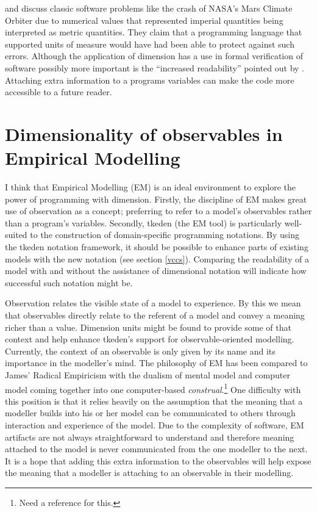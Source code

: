 \documentclass[a4paper]{article}
\begin{document}
\cite{ME_grosu} and \cite{ME_hall} discuss classic software problems like the 
crash of NASA's Mars Climate Orbiter
 due to numerical values that represented imperial quantities being 
interpreted as metric quantities. They claim that a programming language that
supported units of measure would have had been able to protect against
such errors.
Although the application of dimension has a use in formal verification of 
software \cite{ME_grosu,ME_hayes} 
possibly more important is the 
``increased readability'' pointed out by \cite{ME_karrLoveman}. Attaching extra
information to a programs variables can make the code more accessible to a 
future reader.

\section{Dimensionality of observables in Empirical Modelling} 

I think that Empirical Modelling (EM) is an ideal environment
 to explore the power of programming with dimension. Firstly, the discipline 
of EM makes great use of observation as a concept;
preferring to refer to a model's observables rather than a program's variables.
Secondly, tkeden (the EM tool) is particularly well-suited to the construction
of domain-specific programming notations. By using the tkeden notation 
framework, it should be possible to enhance parts of existing models with the 
new notation (see section \ref{vccs}). Comparing the readability of a model 
with and without the assistance of dimensional notation will indicate how 
successful such notation might be.

Observation relates the visible state of a model to experience. By this we
mean that observables directly relate to the referent of a model and convey a 
meaning richer than a value.
Dimension units 
might be found to provide some of that context and help enhance tkeden's 
support for observable-oriented modelling. Currently, the context of an 
observable is only given by its name and its
importance in the modeller's mind. The philosophy of EM has been compared to 
James' Radical Empiricism with the dualism
of mental model and computer model coming together into one computer-based 
\emph{construal}.\footnote{
Need a reference for this.} One difficulty with this
position is that it relies heavily on the assumption that the meaning that a 
modeller builds into his or her model can
be communicated to others through interaction and experience of the model. Due 
to the complexity of software, EM artifacts are not always straightforward to 
understand and therefore meaning attached to the model is never communicated
from the one modeller to the next. It is a hope that adding this extra 
information to the observables will help expose the meaning that a modeller is 
attaching to an observable in their modelling.
\end{document}
